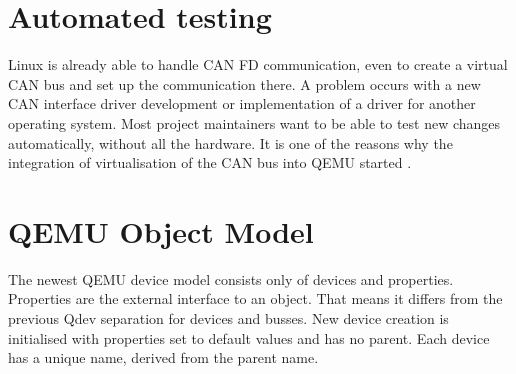 \documentclass{ctuthesis}
\begin{document}
 \section{Automated testing}
 Linux is already able to handle CAN FD communication, even to create a virtual CAN bus and set up the communication there. A problem occurs with a new CAN interface driver development or implementation of a driver for another operating system. Most project maintainers want to be able to test new changes automatically, without all the hardware. It is one of the reasons why the integration of virtualisation of the CAN bus into QEMU started \cite{qemu_development}.

 \section{QEMU Object Model}
  The newest QEMU device model consists only of devices and properties\cite{qemu_qom}. Properties are the external interface to an object. That means it differs from the previous Qdev separation for devices and busses. New device creation is initialised with properties set to default values and has no parent. Each device has a unique name, derived from the parent name.
\end{document}

